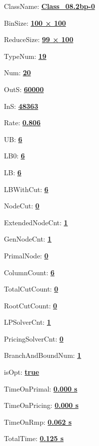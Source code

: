 \documentclass[11pt]{article}
\begin{document}
\pagestyle{empty}


ClassName: \underline{\textbf{Class_08.2bp-0}}
\par
BinSize: \underline{\textbf{100 × 100}}
\par
ReduceSize: \underline{\textbf{99 × 100}}
\par
TypeNum: \underline{\textbf{19}}
\par
Num: \underline{\textbf{20}}
\par
OutS: \underline{\textbf{60000}}
\par
InS: \underline{\textbf{48363}}
\par
Rate: \underline{\textbf{0.806}}
\par
UB: \underline{\textbf{6}}
\par
LB0: \underline{\textbf{6}}
\par
LB: \underline{\textbf{6}}
\par
LBWithCut: \underline{\textbf{6}}
\par
NodeCut: \underline{\textbf{0}}
\par
ExtendedNodeCnt: \underline{\textbf{1}}
\par
GenNodeCnt: \underline{\textbf{1}}
\par
PrimalNode: \underline{\textbf{0}}
\par
ColumnCount: \underline{\textbf{6}}
\par
TotalCutCount: \underline{\textbf{0}}
\par
RootCutCount: \underline{\textbf{0}}
\par
LPSolverCnt: \underline{\textbf{1}}
\par
PricingSolverCnt: \underline{\textbf{0}}
\par
BranchAndBoundNum: \underline{\textbf{1}}
\par
isOpt: \underline{\textbf{true}}
\par
TimeOnPrimal: \underline{\textbf{0.000 s}}
\par
TimeOnPricing: \underline{\textbf{0.000 s}}
\par
TimeOnRmp: \underline{\textbf{0.062 s}}
\par
TotalTime: \underline{\textbf{0.125 s}}
\par
\newpage


\end{document}
